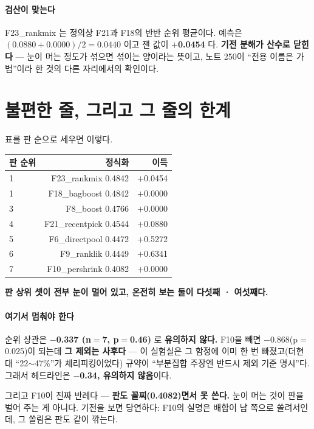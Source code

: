\documentclass[10pt]{article}
\begin{document}
\paragraph{검산이 맞는다} F23\_rankmix 는 정의상 F21과 F18의 반반 순위
평균이다. 예측은 $(0.0880 + 0.0000)/2 = 0.0440$ 이고 잰 값이 \textbf{$+$0.0454}
다. \textbf{기전 분해가 산수로 닫힌다} --- 눈이 머는 정도가 섞으면 섞이는
양이라는 뜻이고, 노트 250이 ``전용 이름은 가법''이라 한 것의 다른 자리에서의
확인이다.

\section{불편한 줄, 그리고 그 줄의 한계}

표를 판 순으로 세우면 이렇다.

\begin{center}\small
\begin{tabular}{lrr}
\hline
판 순위 & 정식화 & 이득 \\
\hline
1 & F23\_rankmix 0.4842 & $+$0.0454 \\
1 & F18\_bagboost 0.4842 & $+$0.0000 \\
3 & F8\_boost 0.4766 & $+$0.0000 \\
4 & F21\_recentpick 0.4544 & $+$0.0880 \\
5 & F6\_directpool 0.4472 & $+$0.5272 \\
6 & F9\_ranklik 0.4449 & $+$0.6341 \\
7 & F10\_pershrink 0.4082 & $+$0.0000 \\
\hline
\end{tabular}
\end{center}

\textbf{판 상위 셋이 전부 눈이 멀어 있고, 온전히 보는 둘이 다섯째 ·
여섯째다.}

\paragraph{여기서 멈춰야 한다} 순위 상관은 \textbf{$-$0.337 (n${=}$7,
p${=}$0.46)} 로 \textbf{유의하지 않다.} F10을 빼면 $-$0.868(p${=}$0.025)이
되는데 \textbf{그 제외는 사후다} --- 이 실험실은 그 함정에 이미 한 번
빠졌고(더현대 ``22$\sim$47\%''가 체리피킹이었다) 규약이 ``부분집합 주장엔
반드시 제외 기준 명시''다. 그래서 헤드라인은 \textbf{$-$0.34, 유의하지
않음}이다.

그리고 F10이 진짜 반례다 --- \textbf{판도 꼴찌(0.4082)면서 못 쓴다.} 눈이
머는 것이 판을 벌어 주는 게 아니다. 기전을 보면 당연하다: F10의 실명은
배합이 남 쪽으로 쏠려서인데, 그 쏠림은 판도 같이 깎는다.
\end{document}
